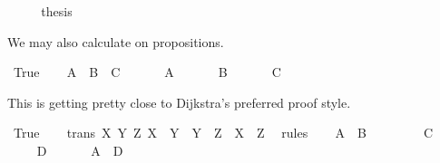 \begin{isabellebody}
\isanewline
\ \ \isamarkupfalse%
\ \isamarkupfalse%
\ {\isacharquery}thesis\ \isamarkupfalse%
\isacommand{{\isachardot}}\isanewline
\isamarkupfalse%
\isamarkupfalse%
%
\begin{isamarkuptext}%
We may also calculate on propositions.%
\end{isamarkuptext}%
\isamarkuptrue%
\ True\isanewline
\isamarkupfalse%
\isanewline
\ \ \isamarkupfalse%
\ {\isachardoublequote}A\ {\isasymlongrightarrow}\ B\ {\isasymlongrightarrow}\ C{\isachardoublequote}\ \isamarkupfalse%
\isanewline
\ \ \isamarkupfalse%
\ \isamarkupfalse%
\ A\ \isamarkupfalse%
\isanewline
\ \ \isamarkupfalse%
\ \isamarkupfalse%
\ B\ \isamarkupfalse%
\isanewline
\ \ \isamarkupfalse%
\ \isamarkupfalse%
\ C\ \isamarkupfalse%
\isacommand{{\isachardot}}\isanewline
\isamarkupfalse%
\isamarkupfalse%
%
\begin{isamarkuptext}%
This is getting pretty close to Dijkstra's preferred proof style.%
\end{isamarkuptext}%
\isamarkuptrue%
\ True\isanewline
\isamarkupfalse%
\isanewline
\ \ \isamarkupfalse%
\ {\isacharbrackleft}trans{\isacharbrackright}{\isacharcolon}\ {\isachardoublequote}{\isasymAnd}X\ Y\ Z{\isachardot}\ X\ {\isasymlongrightarrow}\ Y\ {\isasymLongrightarrow}\ Y\ {\isasymlongrightarrow}\ Z\ {\isasymLongrightarrow}\ X\ {\isasymlongrightarrow}\ Z{\isachardoublequote}\ \isamarkupfalse%
\ rules\isanewline
\ \ \isamarkupfalse%
\ {\isachardoublequote}A\ {\isasymlongrightarrow}\ B{\isachardoublequote}\ \isamarkupfalse%
\isanewline
\ \ \isamarkupfalse%
\ \isamarkupfalse%
\ {\isachardoublequote}{\isasymdots}\ {\isasymlongrightarrow}\ C{\isachardoublequote}\ \isamarkupfalse%
\isanewline
\ \ \isamarkupfalse%
\ \isamarkupfalse%
\ {\isachardoublequote}{\isasymdots}\ {\isasymlongrightarrow}\ D{\isachardoublequote}\ \isamarkupfalse%
\isanewline
\ \ \isamarkupfalse%
\ \isamarkupfalse%
\ {\isachardoublequote}A\ {\isasymlongrightarrow}\ D{\isachardoublequote}\ \isamarkupfalse%
\isacommand{{\isachardot}}\isanewline
\isamarkupfalse%
\isamarkupfalse%

\end{isabellebody}
